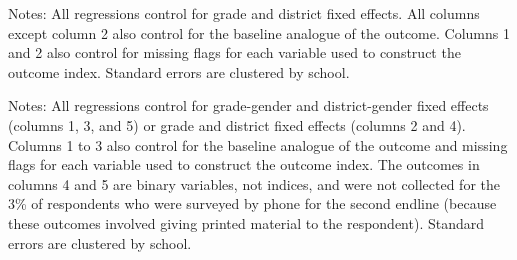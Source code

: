 \documentclass[letterpaper,12pt,pdftex]{article}
\begin{document}
\newpage
{}
\begin{table}
	\tabcolsep=1.8pt
	\caption{Treatment effects on other secondary outcomes (Endline 1)}
	\label{tab_el1_sec}
	\vspace{.4cm}
	\begin{center}
		\small
		
	\end{center}
	\flushleft \footnotesize {Notes: All regressions control for grade and district fixed effects. All columns except column 2 also control for the baseline analogue of the outcome. Columns 1 and 2 also control for missing flags for each variable used to construct the outcome index. Standard errors are clustered by school. }
\end{table}
\restoregeometry

\clearpage



\newpage

\begin{table}
\tabcolsep=2.8pt
		\caption{Treatment effects on attitudes, aspirations, and behavior (Endline 2)}
		\label{tab_el2_primary}
		\begin{center}
		
		\end{center}
		\flushleft \footnotesize {Notes: All regressions control for grade-gender and district-gender fixed effects (columns 1, 3, and 5) or grade and district fixed effects (columns 2 and 4). Columns 1 to 3 also control for the baseline analogue of the outcome and missing flags for each variable used to construct the outcome index. The outcomes in columns 4 and 5 are binary variables, not indices, and were not collected for the 3\% of respondents who were surveyed by phone for the second endline (because these outcomes involved giving printed material to the respondent). Standard errors are clustered by school.}
\end{table}
\restoregeometry

\clearpage
\newpage
\end{document}

